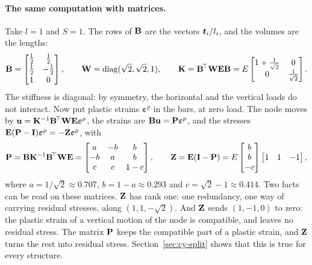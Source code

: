 \paragraph{The same computation with matrices.}
%
Take $l=1$ and $S=1$. The rows of $\mathbf{B}$ are the vectors $\bm{t}_i/l_i$, and
the volumes are the lengths:
\[
  \mathbf{B}=\begin{bmatrix}\tfrac12&\tfrac12\\[1pt]\tfrac12&-\tfrac12\\[1pt]1&0\end{bmatrix},\qquad
  \mathbf{W}=\operatorname{diag}(\sqrt2,\sqrt2,1),\qquad
  \mathbf{K}=\mathbf{B}^{\!\top}\mathbf{W}\mathbf{E}\mathbf{B}=E\begin{bmatrix}1+\tfrac1{\sqrt2}&0\\ 0&\tfrac1{\sqrt2}\end{bmatrix}.
\]
The stiffness is diagonal: by symmetry, the horizontal and the vertical loads
do not interact. Now put plastic strains $\boldsymbol\varepsilon^p$ in the bars,
at zero load. The node moves by $\mathbf{u}=\mathbf{K}^{-1}\mathbf{B}^{\!\top}\mathbf{W}\mathbf{E}\boldsymbol\varepsilon^p$,
the strains are $\mathbf{B}\mathbf{u}=\mathbf{P}\boldsymbol\varepsilon^p$, and the stresses
$\mathbf{E}(\mathbf{P}-\mathbf{I})\boldsymbol\varepsilon^p=-\mathbf{Z}\boldsymbol\varepsilon^p$, with
\begin{equation}\label{eq:cy-truss-PZ}
  \mathbf{P}=\mathbf{B}\mathbf{K}^{-1}\mathbf{B}^{\!\top}\mathbf{W}\mathbf{E}=
  \begin{bmatrix}a&-b&b\\-b&a&b\\c&c&1-c\end{bmatrix},\qquad
  \mathbf{Z}=\mathbf{E}(\mathbf{I}-\mathbf{P})=E\begin{bmatrix}b\\b\\-c\end{bmatrix}\begin{bmatrix}1&1&-1\end{bmatrix},
\end{equation}
where $a=1/\sqrt2\approx0.707$, $b=1-a\approx0.293$ and $c=\sqrt2-1\approx0.414$.
Two facts can be read on these matrices. $\mathbf{Z}$ has rank one: one
redundancy, one way of carrying residual stresses, along $(1,1,-\sqrt2)$. And
$\mathbf{Z}$ sends $(1,-1,0)$ to zero: the plastic strain of a vertical motion of
the node is compatible, and leaves no residual stress. The matrix $\mathbf{P}$ keeps
the compatible part of a plastic strain, and $\mathbf{Z}$ turns the rest into
residual stress. Section~\ref{sec:cy-split} shows that this is true for every
structure.


